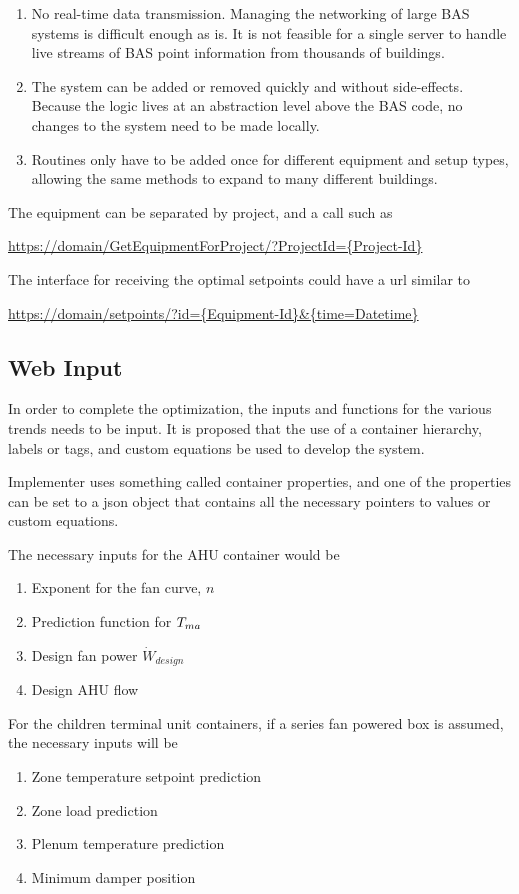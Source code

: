 \begin{enumerate}
    \item No real-time data transmission. Managing the networking of large BAS systems is difficult enough as is. It is not feasible for a single server to handle live streams of BAS point information from thousands of buildings. 

    \item The system can be added or removed quickly and without side-effects. Because the logic lives at an abstraction level above the BAS code, no changes to the system need to be made locally. 

    \item Routines only have to be added once for different equipment and setup types, allowing the same methods to expand to many different buildings. 


\end{enumerate}

The equipment can be separated by project, and a call such as

\url{https://domain/GetEquipmentForProject/?ProjectId={Project-Id}}

The interface for receiving the optimal setpoints could have a url similar to 

\url{https://domain/setpoints/?id={Equipment-Id}\&{time=Datetime}}

\subsection{Web Input}

In order to complete the optimization, the inputs and functions for the various trends needs to be input. It is proposed that the use of a container hierarchy, labels or tags, and custom equations be used to develop the system.

Implementer uses something called container properties, and one of the properties can be set to a json object that contains all the necessary pointers to values or custom equations.

The necessary inputs for the AHU container would be 
\begin{enumerate}
    \item Exponent for the fan curve, \(n\)
    \item Prediction function for \(T_{ma}{}\) 
    \item Design fan power \(\dot{W}_{design}\)
    \item Design AHU flow 
\end{enumerate}
For the children terminal unit containers, if a series fan powered box is assumed, the necessary inputs will be
\begin{enumerate}
    \item Zone temperature setpoint prediction
    \item Zone load prediction
    \item Plenum temperature prediction
    \item Minimum damper position
\end{enumerate}
